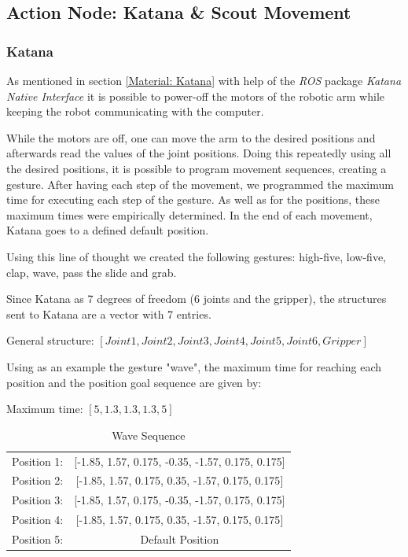 \subsection{Action Node: Katana \& Scout Movement}
\subsubsection{Katana}
As mentioned in section \ref{Material: Katana} with help of the \textit{ROS} package \textit{Katana Native Interface} it is possible to power-off the motors of the robotic arm while keeping the robot communicating with the computer.

While the motors are off, one can move the arm to the desired positions and afterwards read the values of the joint positions. Doing this repeatedly using all the desired positions, it is possible to program movement sequences, creating a gesture. After having each step of the movement, we programmed the maximum time for executing each step of the gesture. As well as for the positions, these maximum times were empirically determined. In the end of each movement, Katana goes to a defined default position.

Using this line of thought we created the following gestures: high-five, low-five, clap, wave, pass the slide and grab.

Since Katana as 7 degrees of freedom (6 joints and the gripper), the structures sent to Katana are a vector with 7 entries.
\begin{center}
General structure:
$\left[ Joint1, Joint2, Joint3, Joint4, Joint5, Joint6, Gripper\right]$\\
\end{center}
Using as an example the gesture "wave", the maximum time for reaching each position and the position goal sequence are given by:
\begin{center}
Maximum time:
$\left[5, 1.3, 1.3, 1.3, 5\right]$\\
\end{center}
\begin{table}[!h]
\centering
\begin{tabular}{lc}
Position 1: & {[}-1.85, 1.57, 0.175, -0.35, -1.57, 0.175, 0.175{]} \\
Position 2: & {[}-1.85, 1.57, 0.175, 0.35, -1.57, 0.175, 0.175{]}  \\
Position 3: & {[}-1.85, 1.57, 0.175, -0.35, -1.57, 0.175, 0.175{]} \\
Position 4: & {[}-1.85, 1.57, 0.175, 0.35, -1.57, 0.175, 0.175{]}  \\
Position 5: & Default Position                                    
\end{tabular}
\caption{Wave Sequence}
\label{wave}
\end{table}

